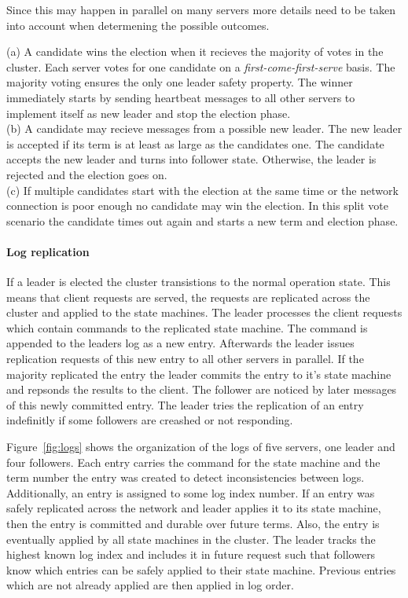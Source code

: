 Since this may happen in parallel on many servers more details
need to be taken into account when determening the possible outcomes.

(a) A candidate wins the election when it recieves the majority of
votes in the cluster. Each server votes for one candidate on a
\textit{first-come-first-serve} basis. The majority voting ensures
the only one leader safety property. The winner immediately starts
by sending heartbeat messages to all other servers to implement itself
as new leader and stop the election phase.~\cite{ongaro2014consensus}\\
(b) A candidate may recieve messages from a possible new leader.
The new leader is accepted if its term is at least as large as
the candidates one. The candidate accepts the new leader and turns
into follower state. Otherwise, the leader is rejected and the election
goes on.~\cite{ongaro2014consensus}\\
(c) If multiple candidates start with the election at the same
time or the network connection is poor enough no candidate may win
the election. In this split vote scenario the candidate times out again
and starts a new term and election phase.\cite{ongaro2014consensus}

\paragraph{Log replication}
If a leader is elected the cluster transistions to the normal operation
state. This means that client requests are served, the requests are
replicated across the cluster and applied to the state machines.
The leader processes the client requests which contain commands to
the replicated state machine. The command is appended to the leaders
log as a new entry. Afterwards the leader issues replication requests
of this new entry to all other servers in parallel. If the majority
replicated the entry the leader commits the entry to it's state machine
and repsonds the results to the client. The follower are noticed by
later messages of this newly committed entry. The leader
tries the replication of an entry indefinitly if some followers
are creashed or not responding.~\cite{ongaro2014search}

Figure~\ref{fig:logs} shows the organization of the logs of five servers,
one leader and four followers. Each entry carries the command for the state
machine and the term number the entry was created to detect inconsistencies
between logs. Additionally, an entry is assigned to some log index number.
If an entry was safely replicated across the network and leader applies
it to its state machine, then the entry is committed and durable over
future terms. Also, the entry is eventually applied by all state machines
in the cluster. The leader tracks the highest known log index and includes
it in future request such that followers know which entries can be
safely applied to their state machine. Previous entries which are
not already applied are then applied in log order.~\cite{ongaro2014consensus}

